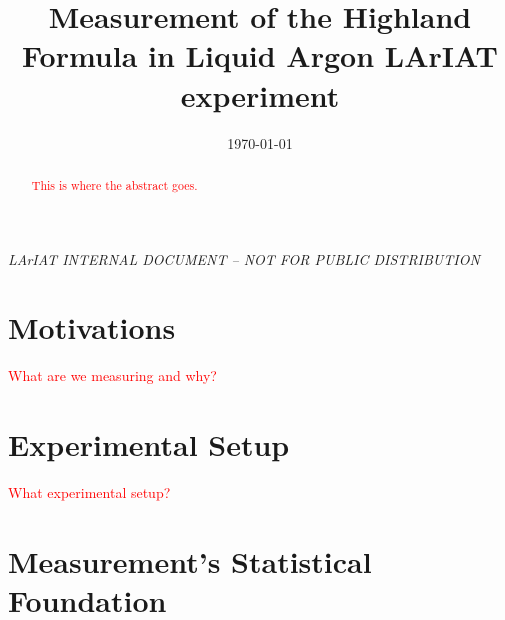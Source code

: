 \documentclass[aps,prl,twocolumn,showpacs,superscriptaddress,groupedaddress]{revtex4}  %
\begin{document}
\widetext
{}
\centerline{\em LArIAT INTERNAL DOCUMENT -- NOT FOR PUBLIC DISTRIBUTION}


\title{Measurement of the Highland Formula in Liquid Argon LArIAT experiment}
\date{\today}


\begin{abstract}
\textcolor{red}{This is where the abstract goes.}
\end{abstract}

\maketitle

\section{\label{sec:Motivations}Motivations }
\textcolor{red}{What are we measuring and why?}
\section{\label{sec:Setup}Experimental Setup}
\textcolor{red}{What experimental setup?}
\section{\label{sec:Stat} Measurement's Statistical Foundation}
\end{document}
